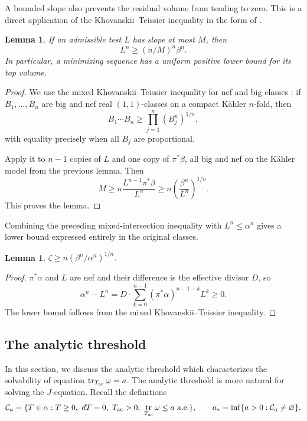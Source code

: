\documentclass[reqno]{amsart}
\numberwithin{equation}{section}
\newtheorem{lemma}[theorem]{Lemma}
\theoremstyle{definition}
\DeclareMathOperator{\tr}{tr}
\begin{document}
A bounded slope also prevents the residual volume from tending
to zero. This is a direct application of the
Khovanskii--Teissier inequality in the form of
\cite[Theorem~2.1]{LX16}.
\begin{lemma}\label{lem:volume-bound}
If an admissible test $L$ has slope at most $M$, then
\[
L^n\geq(n/M)^n\beta^n.
\]
In particular, a minimizing sequence has a uniform positive lower bound for its top volume.
\end{lemma}
\begin{proof}
We use the mixed Khovanskii--Teissier inequality for nef and big classes \cite[Theorem 2.1]{LX16}: if $B_1,\ldots,B_n$ are big and nef real $(1,1)$-classes on a compact K\"ahler $n$-fold, then
\[
B_1\cdots B_n\geq\prod_{j=1}^n(B_j^n)^{1/n},
\]
with equality precisely when all $B_j$ are proportional. 

Apply it to $n-1$ copies of $L$ and one copy of $\pi^*\beta$, all big and nef on the K\"ahler model from the previous lemma. Then
\[
M\geq n\frac{L^{n-1}\pi^*\beta}{L^n}
\geq n\left(\frac{\beta^n}{L^n}\right)^{1/n}.
\]
This proves the lemma. 
\end{proof}

Combining the preceding mixed-intersection inequality with
$L^n\le\alpha^n$ gives a lower bound expressed entirely
in the original classes.
\begin{lemma}
    $\zeta\geq n(\beta^n/\alpha^n)^{1/n}$.
\end{lemma}
\begin{proof}
    $\pi^*\alpha$ and $L$ are nef and their difference is the effective divisor $D$, so
\[
\alpha^n-L^n
=D\cdot\sum_{k=0}^{n-1}(\pi^*\alpha)^{n-1-k}L^k\geq0.
\]
The lower bound follows from the mixed Khovanskii--Teissier inequality.
\end{proof}

\subsection{The analytic threshold}
In this section, we discuss the analytic threshold which characterizes the solvability of equation $\tr_{T_{\rm ac}}\omega=a$.  The analytic threshold is more natural for solving the $J$-equation.  Recall the definitions \begin{equation}\label{eq:threshold}
 \mathcal C_a=\{T\in\alpha:T\ge0,\ dT=0,\ T_{\rm ac}>0,
                          \ \tr_{T_{\rm ac}}\omega\le a\text{ a.e.}\},
 \qquad a_*=\inf\{a>0:\mathcal C_a\ne\varnothing\}.
\end{equation}
\end{document}
